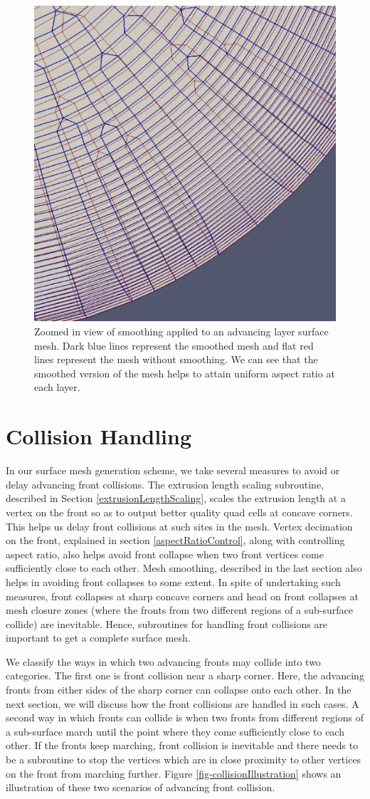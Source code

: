 \begin{figure}
\centering
\includegraphics[width=0.4\linewidth]{img/m2/smoothing/smoothing-comparison-cylinder-cap.eps}
\caption{Zoomed in view of smoothing applied to an advancing layer surface mesh. Dark blue lines represent the smoothed mesh and flat red lines represent the mesh without smoothing. We can see that the smoothed version of the mesh helps to attain uniform aspect ratio at each layer.}
\label{fig-smoothing-cylinder}
\end{figure}

\section{Collision Handling}

In our surface mesh generation scheme, we take several measures to avoid or delay advancing front collisions. The extrusion length scaling subroutine, described in Section \ref{extrusionLengthScaling}, scales the extrusion length at a vertex on the front so as to output better quality quad cells at concave corners. This helps us delay front collisions at such sites in the mesh. Vertex decimation on the front, explained in section \ref{aspectRatioControl}, along with controlling aspect ratio, also helps avoid front collapse when two front vertices come sufficiently close to each other. Mesh smoothing, described in the last section also helps in avoiding front collapses to some extent. In spite of undertaking such measures, front collapses at sharp concave corners and head on front collapses at mesh closure zones (where the fronts from two different regions of a sub-surface collide) are inevitable. Hence, subroutines for handling front collisions are important to get a complete surface mesh.

We classify the ways in which two advancing fronts may collide into two categories. The first one is front collision near a sharp corner. Here, the advancing fronts from either sides of the sharp corner can collapse onto each other. In the next section, we will discuss how the front collisions are handled in such cases. A second way in which fronts can collide is when two fronts from different regions of a sub-surface march until the point where they come sufficiently close to each other. If the fronts keep marching, front collision is inevitable and there needs to be a subroutine to stop the vertices which are in close proximity to other vertices on the front from marching further. Figure \ref{fig-collisionIllustration} shows an illustration of these two scenarios of advancing front collision.

